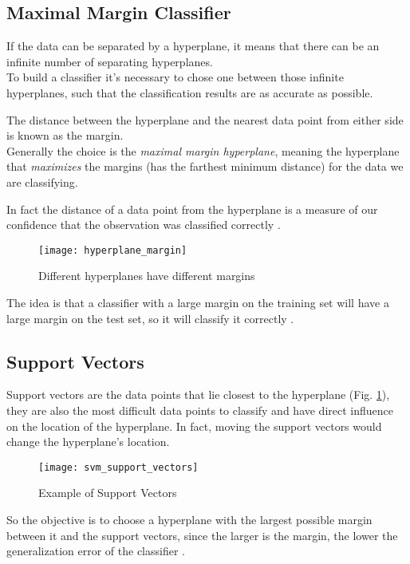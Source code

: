 \subsection{Maximal Margin Classifier}
If the data can be separated by a hyperplane, it means that there can be an infinite number of separating hyperplanes. \\
To build a classifier it's necessary to chose one between those infinite hyperplanes, such that the classification results are as accurate as possible.

The distance between the hyperplane and the nearest data point from either side is known as the margin.\\
Generally the choice is the \textit{maximal margin hyperplane}, meaning the hyperplane that \textit{maximizes} the margins (has the farthest minimum distance) for the data we are classifying.

In fact the distance of a data point from the hyperplane is a measure of our confidence that the observation was classified correctly \cite{ISLR}.

\begin{figure}[H]
	\centering
	\texttt{[image: hyperplane\_margin]}
	\caption{Different hyperplanes have different margins \cite{svm_monkeylearn}}
\end{figure}

The idea is that a classifier with a large margin on the training set will have a large margin on the test set, so it will classify it correctly \cite{ISLR}.

\subsection{Support Vectors}
Support vectors are the data points that lie closest to the hyperplane (Fig. \ref{fig:suppvec}), they are also the most difficult data points to classify and have direct influence on the location of the hyperplane. In fact, moving the support vectors would change the hyperplane's location.

\begin{figure}[H]
	\centering
	\texttt{[image: svm\_support\_vectors]}
	\caption{Example of Support Vectors}
	\label{fig:suppvec}
\end{figure}

So the objective is to choose a hyperplane with the largest possible margin between it and the support vectors, since the larger is the margin, the lower the generalization error of the classifier \cite{ISLR}.

